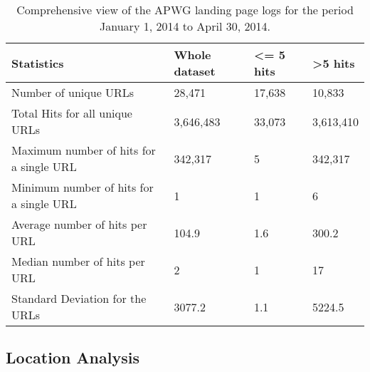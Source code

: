 \documentclass[conference]{IEEEtran}
\begin{document}
\begin{table}[h]
\caption{Comprehensive view of the APWG landing page logs for the period January 1, 2014 to April 30, 2014.} \label{tab:url stats}
\begin{small}
\centering
\begin{tabular}{|>{\raggedright}p{3cm}|>{\raggedright}p{1.15cm}|>{\raggedright}p{1.75cm}|p{1.5cm}|} \hline
\small Statistics &\small Whole dataset &\small \textless= 5 hits &\small \textgreater  5 hits \\ \hline
Number of unique URLs & 28,471 & 17,638 & 10,833  \\ \hline
Total Hits for all unique URLs & 3,646,483 & 33,073 & 3,613,410 \\ \hline
Maximum number of hits for a single URL & 342,317 & 5 & 342,317 \\ \hline
Minimum number of hits for a single URL & 1 & 1 & 6 \\ \hline
Average number of hits per URL & 104.9	& 1.6 & 300.2 \\ \hline
Median number of hits per URL & 2 & 1 & 17\\ \hline
Standard Deviation for the URLs & 3077.2 & 1.1 & 5224.5 \\ \hline
\end{tabular}
\end{small}
\end{table}


\subsection{Location Analysis}
\end{document}
